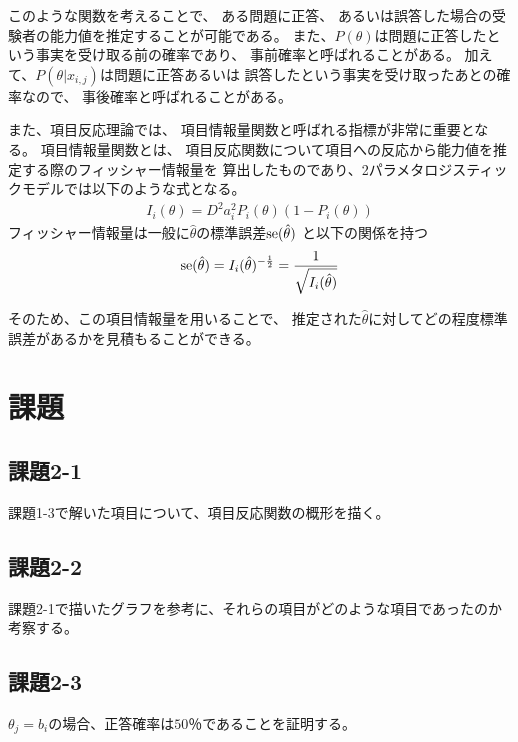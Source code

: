 \documentclass[12pt]{jarticle}
\begin{document}
このような関数を考えることで、
ある問題に正答、
あるいは誤答した場合の受験者の能力値を推定することが可能である。
また、$P(\theta)$は問題に正答したという事実を受け取る前の確率であり、
事前確率と呼ばれることがある。
加えて、$P(\theta|x_{i,j})$は問題に正答あるいは
誤答したという事実を受け取ったあとの確率なので、
事後確率と呼ばれることがある。

また、項目反応理論では、
項目情報量関数と呼ばれる指標が非常に重要となる。
項目情報量関数とは、
項目反応関数について項目への反応から能力値を推定する際のフィッシャー情報量を
算出したものであり、2パラメタロジスティックモデルでは以下のような式となる。
\begin{eqnarray}
    I_i(\theta)=D^2a_i^2 P_i(\theta)(1-P_i(\theta))
\end{eqnarray}
フィッシャー情報量は一般に$\hat{\theta}$の標準誤差${\rm se}(\hat{\theta})$
と以下の関係を持つ
\begin{eqnarray}
    {\rm se}(\hat{\theta})=I_i(\hat{\theta})^{-\frac{1}{2}}=\frac{1}{\sqrt{I_i(\hat{\theta})}}
\end{eqnarray}

そのため、この項目情報量を用いることで、
推定された$\hat{\theta}$に対してどの程度標準誤差があるかを見積もることができる。

\clearpage
\section{課題}
\subsection{課題2-1}
\begin{shadebox}
    課題1-3で解いた項目について、項目反応関数の概形を描く。
\end{shadebox}

\subsection{課題2-2}
\begin{shadebox}
    課題2-1で描いたグラフを参考に、それらの項目がどのような項目であったのか考察する。
\end{shadebox}

\subsection{課題2-3}
\begin{shadebox}
    $\theta_j=b_i$の場合、正答確率は$50％$であることを証明する。
\end{shadebox}
\end{document}
